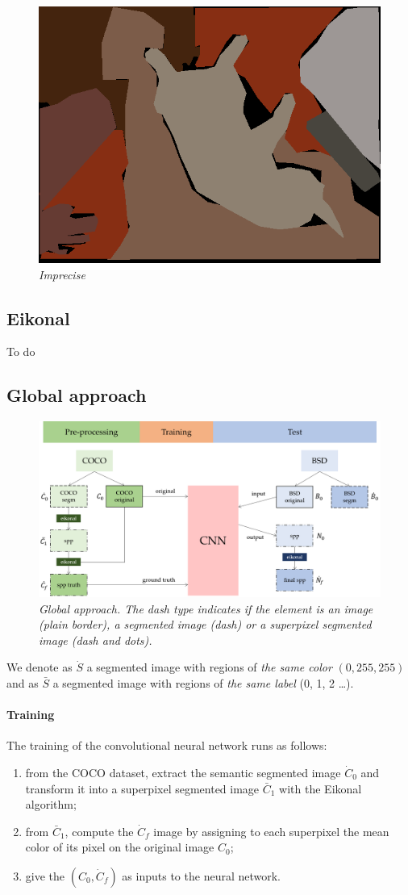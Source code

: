 \documentclass{article}
\begin{document}
        \begin{figure}[!ht]
            \centering
            \includegraphics[width=0.3\linewidth]{pics/img_segm_coco.png}
            \caption{\textit{Imprecise}}
            \label{fig:imprecise}
        \end{figure}

    \subsection{Eikonal}
        To do
    \subsection{Global approach}
        \begin{figure}[!ht]
            \centering
            \includegraphics[width=\linewidth]{pics/schema-global.png}
            \caption{\textit{Global approach. The dash type indicates if the element is an image (plain border), a segmented image (dash) or a superpixel segmented image (dash and dots).}}
        \end{figure}
        \par
        We denote as $\dot S$ a segmented image with regions of \textit{the same color} $(0, 255, 255)$  and as $\bar S$ a segmented image with regions of \textit{the same label} (0, 1, 2 \dots).
        \paragraph{Training}
        The training of the convolutional neural network runs as follows:
        \begin{enumerate}
            \item from the COCO dataset, extract the semantic segmented image $\dot C_0$ and transform it into a superpixel segmented image $\bar C_1$ with the Eikonal algorithm;
            \item from $\bar C_1$, compute the $\dot C_f$ image by assigning to each superpixel the mean color of its pixel on the original image $C_0$;
            \item give the $(C_0, \dot C_f)$ as inputs to the neural network.
        \end{enumerate}
\end{document}
